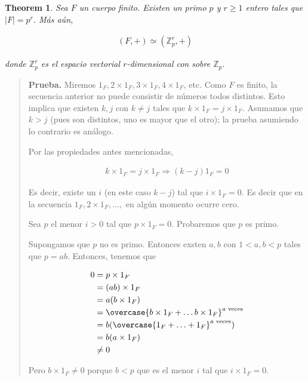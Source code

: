 \documentclass[a4paper]{article}
\newtheorem{theorem}{Theorem}
\newtheorem{theorem}{Theorem}
\begin{document}
\begin{theorem}
    Sea $F$ un cuerpo finito. Existen un primo $p$ y $r \geq 1$ entero
    tales que $|F| = p^r$. Más aún, 

    \begin{align*}
        (F, +) \simeq (\mathbb{Z}^r_p, +)
    \end{align*}

    donde $\mathbb{Z}_p^r$ es el espacio vectorial $r$-dimensional con
    sobre $\mathbb{Z}_p$.
\end{theorem}


\small
\begin{quote}

\textbf{Prueba.} Miremos $1_F, 2\times 1_F, 3\times 1_F, 4\times 1_F$, etc.
Como $F$ es finito, la secuencia anterior no puede consistir de números todos
distintos. Esto implica que existen $k, j$ con $k \neq j$ tales que $k\times
1_F = j\times 1_F$. Asumamos que $k > j$ (pues son distintos, uno es mayor que
el otro); la prueba asumiendo lo contrario es análogo.

Por las propiedades antes mencionadas, 

\begin{align*}
    k\times 1_F = j \times 1_F \Rightarrow (k - j) 1_F = 0
\end{align*}

Es decir, existe un $i$ (en este caso $k - j$) tal que $i\times  1_F = 0$.
Es decir que en la secuencia $1_F, 2 \times 1_F, \ldots, $ en algún momento 
ocurre cero.

Sea $p$ el menor $i > 0$ tal que $p \times 1_F = 0$. Probaremos que 
$p$ es primo.

Supongamos que $p$ no es primo. Entonces exsten $a, b$ con $1 < a, b < p$ tales
que $p = ab$. Entonces, tenemos que 

\begin{align*}
    0 &= p\times 1_F \\ 
      &= (ab) \times 1_F \\ 
      &=a(b\times 1_F) \\ 
      &= \overcase{b \times 1_F + \ldots b \times 1_F}^{a \text{ veces}} \\ 
      &= b(\overcase{1_F + \ldots + 1_F}^{a \text{ veces}}) \\ 
      &= b(a \times 1_F) \\ &\neq 0
\end{align*}

Pero $b \times 1_F \neq 0$ porque $b < p$ que es el menor $i$ tal que $i \times
1_F = 0$. 


\end{quote}
\end{document}
